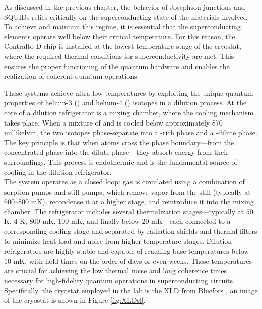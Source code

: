 As discussed in the previous chapter, the behavior of Josephson junctions and SQUIDs relies critically on the superconducting state of the materials involved. 
To achieve and maintain this regime, it is essential that the superconducting elements operate well below their critical temperature. 
For this reason, the Contralto-D chip is installed at the lowest temperature stage of the cryostat, where the required thermal conditions for superconductivity are met. 
This ensures the proper functioning of the quantum hardware and enables the realization of coherent quantum operations.

These systems achieve ultra-low temperatures by exploiting the unique quantum properties of helium-3 () and helium-4 () isotopes in a dilution process.
At the core of a dilution refrigerator is a mixing chamber, where the cooling mechanism takes place. 
When a mixture of  and  is cooled below approximately 870 millikelvin, the two isotopes phase-separate into a -rich phase and a -dilute phase. 
The key principle is that when  atoms cross the phase boundary—from the concentrated phase into the dilute phase—they absorb energy from their surroundings. 
This process is endothermic and is the fundamental source of cooling in the dilution refrigerator.\\
The system operates as a closed loop:  gas is circulated using a combination of sorption pumps and still pumps, which remove  vapor from the still (typically at $600–800$ mK), recondense it at a higher stage, and reintroduce it into the mixing chamber. 
The refrigerator includes several thermalization stages—typically at $50$ K, $4$ K, $800$ mK, $100$ mK, and finally below $20$ mK—each connected to a corresponding cooling stage and separated by radiation shields and thermal filters to minimize heat load and noise from higher-temperature stages.
Dilution refrigerators are highly stable and capable of reaching base temperatures below $10$ mK, with hold times on the order of days or even weeks. 
These temperatures are crucial for achieving the low thermal noise and long coherence times necessary for high-fidelity quantum operations in superconducting circuits.
Specifically, the cryostat employed in the lab is the XLD from Bluefors \cite{XLD1000}, an image of the cryostat is shown in Figure \ref{fig:XLDsl}.

